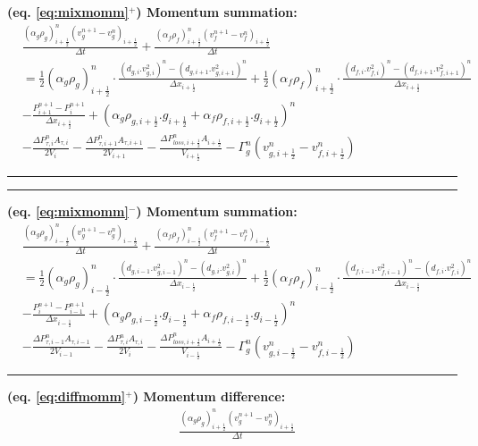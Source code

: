 \documentclass[11pt,letterpaper,titlepage]{article}
\newcommand{\half}{\frac{1}{2}}
\begin{document}
\begin{landscape}
\textbf{(eq. \ref{eq:mixmomm}$^+$) Momentum summation:}
\begin{equation*}
\begin{aligned}
&\frac{(\alpha_g\rho_g )_{i+\half}^{n} (v_g^{n+1}-v_g^{n})_{i+\half}}{\Delta t}+\frac{(\alpha_f\rho_f )_{i+\half}^{n} (v_f^{n+1}-v_f^{n})_{i+\half}}{\Delta t}\\
&=\half (\alpha_g \rho_{g})_{i+\half}^n \cdot\frac{(d_{g,i}.v_{g,i}^2)^n-(d_{g,i+1}.v_{g,i+1}^2)^n}{\Delta x_{i+\half}} 
+\half (\alpha_f \rho_{f})_{i+\half}^n \cdot\frac{(d_{f,i}.v_{f,i}^2)^n-(d_{f,i+1}.v_{f,i+1}^2)^n}{\Delta x_{i+\half}} \\
&-\frac{P_{i+1}^{n+1}-P_i^{n+1}}{\Delta x_{i+\half}} + (\alpha_g \rho_{g,i+\half}.g_{i+\half} + \alpha_f\rho_{f,i+\half}.g_{i+\half})^n\\
&-\frac{\Delta P_{\tau,i}^n A_{\tau,i}}{2V_i}-\frac{\Delta P_{\tau,i+1}^n A_{\tau,i+1}}{2V_{i+1}} 
-\frac{\Delta P_{loss,i+\half}^n A_{i+\half}}{V_{i+\half}} - \Gamma_g^n (v_{g,i+\half}^n - v_{f,i+\half}^n)
\end{aligned}
\end{equation*}
\noindent\rule{9in}{0.4pt}
\newpage
\noindent\rule{9in}{0.4pt}
\textbf{(eq. \ref{eq:mixmomm}$^-$) Momentum summation:}
\begin{equation*}
\begin{aligned}
&\frac{(\alpha_g\rho_g )_{i-\half}^{n} (v_g^{n+1}-v_g^{n})_{i-\half}}{\Delta t}+\frac{(\alpha_f\rho_f )_{i-\half}^{n} (v_f^{n+1}-v_f^{n})_{i-\half}}{\Delta t}\\
&=\half (\alpha_g \rho_{g})_{i-\half}^n \cdot\frac{(d_{g,i-1}.v_{g,i-1}^2)^n-(d_{g,i}.v_{g,i}^2)^n}{\Delta x_{i-\half}} 
+\half (\alpha_f \rho_{f})_{i-\half}^n \cdot\frac{(d_{f,i-1}.v_{f,i-1}^2)^n-(d_{f,i}.v_{f,i}^2)^n}{\Delta x_{i-\half}} \\
&-\frac{P_{i}^{n+1}-P_{i-1}^{n+1}}{\Delta x_{i-\half}} + (\alpha_g \rho_{g,i-\half}.g_{i-\half} + \alpha_f\rho_{f,i-\half}.g_{i-\half})^n\\
&-\frac{\Delta P_{\tau,i-1}^n A_{\tau,i-1}}{2V_{i-1}}-\frac{\Delta P_{\tau,i}^n A_{\tau,i}}{2V_{i}} 
-\frac{\Delta P_{loss,i+\half}^n A_{i+\half}}{V_{i-\half}} - \Gamma_g^n (v_{g,i-\half}^n - v_{f,i-\half}^n)
\end{aligned}
\end{equation*}
\noindent\rule{9in}{0.4pt}
\textbf{(eq. \ref{eq:diffmomm}$^+$) Momentum difference:}
\begin{equation*}
\begin{aligned}
&\frac{(\alpha_g\rho_g )_{i+\half}^n (v_g^{n+1} -v_g^{n})_{i+\half}}{\Delta t}

\end{aligned}
\end{equation*}
\end{landscape}
\end{document}
